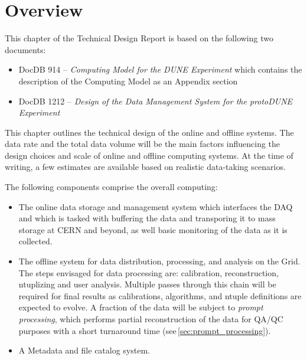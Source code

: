 \section{Overview}

This chapter of the Technical Design Report is based on the following two documents:
\begin{itemize}
\item DocDB 914 --  \textit{Computing Model for the DUNE Experiment}  which contains the
description of the \pd Computing Model as an Appendix section

\item DocDB 1212 -- \textit{Design of the Data Management System for the
protoDUNE Experiment}

\end{itemize}

\noindent This chapter outlines  the technical design of the online and offline systems.
The data rate and the total data volume will be the main factors influencing the design choices and scale of \pd
online and offline computing systems.   At the time of writing, a few estimates are available based on
realistic data-taking scenarios.

The following components comprise the overall \pd computing:
\begin{itemize}

\item The online data storage and management system which interfaces the DAQ and which is tasked with buffering
the data and transporing it to mass storage at CERN and beyond, as well basic monitoring of the data as it is collected.

\item The offline system for data distribution, processing, and analysis on the Grid.  The steps envisaged for data processing are: 
calibration, reconstruction, ntuplizing and user analysis.  Multiple passes through this chain will be required for final results as
calibrations, algorithms, and ntuple definitions are expected to evolve.
A fraction of the data will be subject to \textit{prompt processing}, which performs partial reconstruction of the data for QA/QC purposes
with a short turnaround time (see\,\ref{sec:prompt_processing}).

\item  A Metadata and file catalog system.
\end{itemize}



